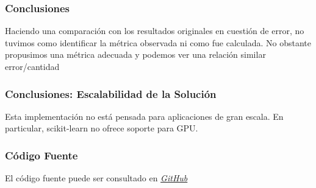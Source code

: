\documentclass{beamer}
\begin{document}
    \begin{frame}
        \frametitle{Conclusiones}
        \hspace*{20pt}Haciendo una comparación con los resultados originales en cuestión de error, no tuvimos como identificar la métrica observada ni 
        como fue calculada. No obstante propusimos una métrica adecuada y podemos ver una relación similar error/cantidad 

        
        \begin{table}[]
            \caption{Comparación del Error.}
            \end{table}
        
    \end{frame}  

    \begin{frame}
        \frametitle{Conclusiones: Escalabilidad de la Solución}

        \hspace*{20pt}Esta implementación no está pensada para aplicaciones de gran escala. 
        En particular, scikit-learn no ofrece soporte para GPU.
    \end{frame}  

    \begin{frame}
        \frametitle{Código Fuente}
        El código fuente puede ser consultado en \href{https://github.com/fbusso/ic-tp1}{\textit{GitHub}}
    \end{frame} 
\end{document}
